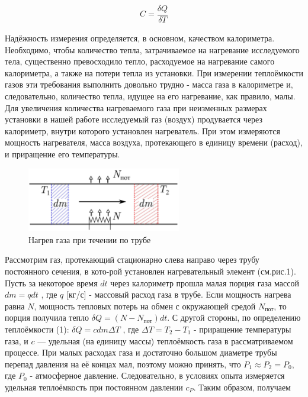 \documentclass[a4paper,12pt]{article} %
\begin{document}
\begin{equation}
\begin{aligned}
C = \dfrac{\delta Q}{\delta T} 
\end{aligned}
\end{equation}


\noindent Надёжность измерения определяется, в основном, качеством калориметра. Необходимо, чтобы количество тепла, затрачиваемое на нагревание исследуемого тела, существенно превосходило тепло, расходуемое на нагревание самого калориметра, а также на потери тепла из установки. При измерении теплоёмкости газов эти требования выполнить довольно трудно - масса газа в калориметре и, следовательно, количество тепла, идущее на его нагревание, как правило, малы. Для увеличения количества нагреваемого газа при неизменных размерах установки в нашей работе исследуемый газ (воздух) продувается через калориметр, внутри которого установлен нагреватель. При этом измеряются мощность нагревателя, масса воздуха, протекающего в единицу времени (расход), и приращение его температуры.

\begin{figure}
  \begin{center}
    \includegraphics[width = 0.6\textwidth]{труба.JPG}
  \end{center}
  \caption{Нагрев газа при течении по трубе}
\end{figure}

\noindent Рассмотрим газ, протекающий стационарно слева направо через трубу постоянного сечения, в кото-рой установлен нагревательный элемент (см.рис.1). Пусть за некоторое время $dt$ через калориметр прошла малая порция газа массой $dm = q dt$ , где $q$ [кг/с] - массовый расход газа в трубе. Если мощность нагрева равна $N$, мощность тепловых потерь на обмен с окружающей средой $N_{\text{пот}}$, то порция получила тепло $\delta Q =(N - N_{\text{пот}})dt$. С другой стороны, по определению теплоёмкости
(1): $\delta Q =c dm \Delta T$ , где $\Delta T = T_2 - T_1$ - приращение температуры газа, и $c$ — удельная (на единицу массы) теплоёмкость газа в рассматриваемом процессе. При малых расходах газа и достаточно большом диаметре трубы перепад давления на её концах мал, поэтому можно принять, что $P_1 \approx P_2 = P_0$, где $P_0$ - атмосферное давление. Следовательно, в условиях опыта измеряется удельная теплоёмкость при постоянном давлении $c_P$. Таким образом, получаем
\end{document}

